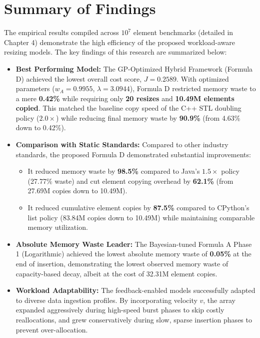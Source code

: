 \section{Summary of Findings}
The empirical results compiled across $10^7$ element benchmarks (detailed in 
Chapter 4) demonstrate the high efficiency of the proposed workload-aware 
resizing models. The key findings of this research are summarized below:
\begin{itemize}
    \item \textbf{Best Performing Model:} The GP-Optimized Hybrid Framework 
    (Formula D) achieved the lowest overall cost score, $J = 0.2589$. With optimized 
    parameters ($w_A = 0.9955$, $\lambda = 3.0944$), Formula D restricted 
    memory waste to a mere \textbf{0.42\%} while requiring only \textbf{20 resizes} 
    and \textbf{10.49M elements copied}. This matched the baseline copy speed 
    of the C++ STL doubling policy ($2.0\times$) while reducing final memory 
    waste by \textbf{90.9\%} (from 4.63\% down to 0.42\%).
    \item \textbf{Comparison with Static Standards:} Compared to other industry 
    standards, the proposed Formula D demonstrated substantial improvements:
    \begin{itemize}
        \item It reduced memory waste by \textbf{98.5\%} compared to Java's 
        $1.5\times$ policy (27.77\% waste) and cut element copying overhead by 
        \textbf{62.1\%} (from 27.69M copies down to 10.49M).
        \item It reduced cumulative element copies by \textbf{87.5\%} compared 
        to CPython's list policy (83.84M copies down to 10.49M) while maintaining 
        comparable memory utilization.
    \end{itemize}
    \item \textbf{Absolute Memory Waste Leader:} The Bayesian-tuned Formula A 
    Phase 1 (Logarithmic) achieved the lowest absolute memory waste of \textbf{0.05\%} 
    at the end of insertion, demonstrating the lowest observed memory waste of capacity-based 
    decay, albeit at the cost of 32.31M element copies.
    \item \textbf{Workload Adaptability:} The feedback-enabled models successfully 
    adapted to diverse data ingestion profiles. By incorporating velocity $v$, the 
    array expanded aggressively during high-speed burst phases to skip costly 
    reallocations, and grew conservatively during slow, sparse insertion phases 
    to prevent over-allocation.
\end{itemize}

